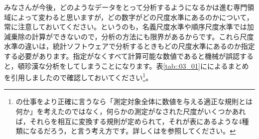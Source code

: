 \documentclass{ltjsbook}
\begin{document}
みなさんが今後，どのようなデータをとって分析するようになるかは進む専門領域によって変わると思いますが，どの数字がどの尺度水準にあるのかについて，常に注意しておいてください。というのも，名義尺度水準や順序尺度水準では加減乗除の計算ができないので，分析の方法にも限界があるからです。これら尺度水準の違いは，統計ソフトウェアで分析するときもどの尺度水準にあるのか指定する必要があります。指定がなくすべて計算可能な数値であると機械が誤認すると，頓珍漢な分析をしてしまうことになります。表\ref{tab::03_01}に\textcite{stevens1946}によるまとめを引用しましたので確認しておいてください\footnote{\textcite{stevens1946}の仕事をより正確に言うなら「測定対象全体に数値を与える適正な規則とは何か」を考えたのではなく，何らかの測定がなされた尺度がいくつかあれば，それらを相互に変換する規則が定められて，それが表にあるような4種類になるだろう，と言う考え方です。詳しくは\textcite{Yoshino2007}を参照してください。}。
\end{document}
